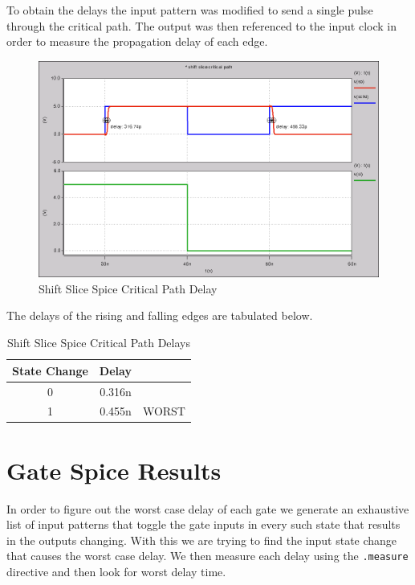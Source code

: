         \newpage

        To obtain the delays the input pattern was modified to send a single
        pulse through the critical path.  The output was then referenced to the
        input clock in order to measure the propagation delay of each edge.

        \begin{figure}[H]
            \centering
            \includegraphics[width=0.75\linewidth]{../../spice/shift_slice_crit_path.png}
            \caption{Shift Slice Spice Critical Path Delay}
        \end{figure}

        \vspace{\baselineskip}

        The delays of the rising and falling edges are tabulated below.

        \begin{table}[H]
            \centering
            \begin{tabular}{crc}
                \toprule
                \textbf{State Change} & \textbf{Delay} & \\
                \midrule
                0 & 0.316n & \\
                1 & 0.455n & WORST \\
                \bottomrule
            \end{tabular}
            \caption{Shift Slice Spice Critical Path Delays}
        \end{table}


    \newpage
\section{Gate Spice Results}
    In order to figure out the worst case delay of each gate we generate an
    exhaustive list of input patterns that toggle the gate inputs in every such
    state that results in the outputs changing. With this we are trying to find
    the input state change that causes the worst case delay. We then measure
    each delay using the \texttt{.measure} directive and then look for worst
    delay time.

